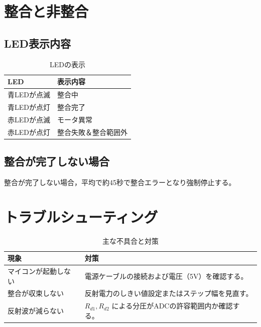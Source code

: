 \documentclass[uplatex, 12pt,oneside,openany]{ujbook}
\begin{document}
\section{整合と非整合}
\subsection{LED表示内容}

\begin{table}[htbp]
    \centering
    \caption{LEDの表示}
    \begin{tabular}{|l|l|}
        \hline
        LED & 表示内容 \\ \hline
        青LEDが点滅 & 整合中 \\ \hline
        青LEDが点灯 & 整合完了 \\ \hline
        赤LEDが点滅 & モータ異常 \\ \hline
        赤LEDが点灯 & 整合失敗＆整合範囲外 \\ \hline
    \end{tabular}
\end{table}

\subsection{整合が完了しない場合}
整合が完了しない場合，平均で約45秒で整合エラーとなり強制停止する。

\newpage

\section{トラブルシューティング}
\begin{table}[htbp]
    \centering
    \caption{主な不具合と対策}
    \begin{tabular}{|l|l|}
        \hline
        現象 & 対策 \\ \hline
        マイコンが起動しない & 電源ケーブルの接続および電圧（5V）を確認する。 \\ \hline
        整合が収束しない & 反射電力のしきい値設定またはステップ幅を見直す。 \\ \hline
        反射波が減らない & $R_{d1}, R_{d2}$ による分圧がADCの許容範囲内か確認する。 \\ \hline
    \end{tabular}
\end{table}
\end{document}
